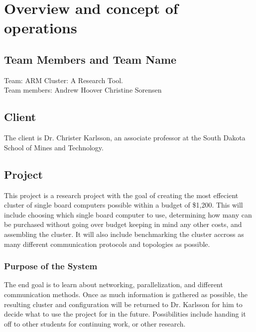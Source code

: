 

\chapter{Overview and concept of operations}


\section{Team Members and Team Name}
Team: ARM Cluster: A Research Tool.\\
Team members: Andrew Hoover Christine Sorensen

\section{Client}

The client is Dr. Christer Karlsson, an associate professor at the South Dakota School of Mines and Technology.

\section{Project}

This project is a research project with the goal of creating the most effecient cluster of single board computers possible within a budget of \$1,200. This will include choosing which single board computer to use, determining how many can be purchased without going over budget keeping in mind any other costs, and assembling the cluster. It will also include benchmarking the cluster accross as many different communication protocols and topologies as possible. 

\subsection{Purpose of the System}

The end goal is to learn about networking, parallelization, and different communication methods. Once as much information is gathered as possible, the resulting cluster and configuration will be returned to Dr. Karlsson for him to decide what to use the project for in the future. Possibilities include handing it off to other students for continuing work, or other research.


